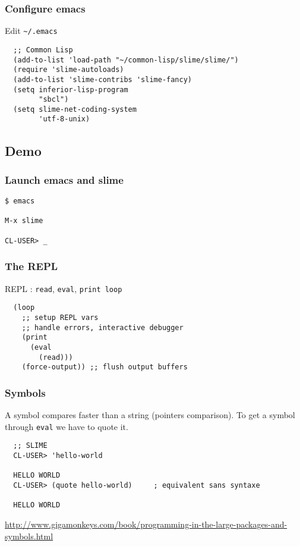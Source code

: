 \documentclass[8pt]{beamer}
\begin{document}
\begin{frame}[fragile]
  \frametitle{Configure emacs}
  Edit \tt{\textasciitilde/.emacs}
\begin{verbatim}
  ;; Common Lisp
  (add-to-list 'load-path "~/common-lisp/slime/slime/")
  (require 'slime-autoloads)
  (add-to-list 'slime-contribs 'slime-fancy)
  (setq inferior-lisp-program
        "sbcl")
  (setq slime-net-coding-system
        'utf-8-unix)
\end{verbatim}
\end{frame}

\subsection{Demo}

\begin{frame}[fragile]
  \frametitle{Launch emacs and slime}
\begin{verbatim}
$ emacs

M-x slime

CL-USER> _
\end{verbatim}
\end{frame}

\begin{frame}[fragile]
  \frametitle{The REPL}
  REPL : {\tt read}, {\tt eval}, {\tt print loop}
\begin{verbatim}
  (loop
    ;; setup REPL vars
    ;; handle errors, interactive debugger
    (print
      (eval
        (read)))
    (force-output)) ;; flush output buffers
\end{verbatim}
\end{frame}

\begin{frame}[fragile]
  \frametitle{Symbols}
  A symbol compares faster than a string
  (pointers comparison).
  To get a symbol through {\tt eval} we have to quote it.
\begin{verbatim}
  ;; SLIME
  CL-USER> 'hello-world
  
  HELLO WORLD
  CL-USER> (quote hello-world)     ; equivalent sans syntaxe
  
  HELLO WORLD
\end{verbatim}
  \vspace{1em}
  \url{http://www.gigamonkeys.com/book/programming-in-the-large-packages-and-symbols.html}
\end{frame}
\end{document}
